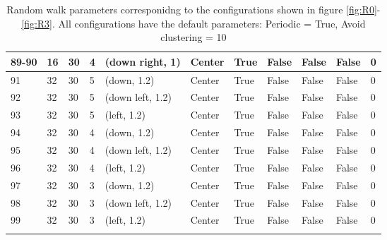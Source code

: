 \begin{longtable}{|C{0.9cm}|C{0.8cm}|C{0.8cm}|C{0.8cm}|C{3cm}|C{1.5cm}|C{1.5cm}|C{0.8cm}|C{0.8cm}|C{1cm}|C{1cm}|}
    89-90 &  16 &  30 &  4 & (down right, 1) & Center & True & False & False & False & 0 \\ \hline
    
    
    91 &  32 &  30 &  5 & (down, 1.2) & Center & True & False & False & False & 0 \\ \hline

    92 &  32 &  30 &  5 & (down left, 1.2) & Center & True & False & False & False & 0 \\ \hline

    93 &  32 &  30 &  5 & (left, 1.2) & Center & True & False & False & False & 0 \\ \hline

    94 &  32 &  30 &  4 & (down, 1.2) & Center & True & False & False & False & 0 \\ \hline

    95 &  32 &  30 &  4 & (down left, 1.2) & Center & True & False & False & False & 0 \\ \hline

    96 &  32 &  30 &  4 & (left, 1.2) & Center & True & False & False & False & 0 \\ \hline

    97 &  32 &  30 &  3 & (down, 1.2) & Center & True & False & False & False & 0 \\ \hline

    98 &  32 &  30 &  3 & (down left, 1.2) & Center & True & False & False & False & 0 \\ \hline

    99 &  32 &  30 &  3 & (left, 1.2) & Center & True & False & False & False & 0 \\ \hline
    \caption{Random walk parameters corresponidng to the configurations shown in figure \ref{fig:R0}-\ref{fig:R3}. All configurations have the default parameters: Periodic = True, Avoid clustering = 10}
    \label{tab:RW_details}
    \end{longtable}


